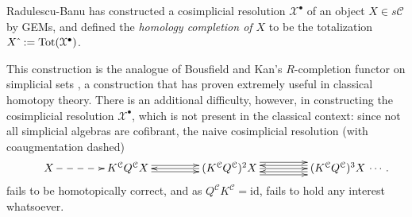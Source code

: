 \documentclass[11pt]{amsart} \renewcommand{\baselinestretch}{1.2}
\theoremstyle{plain}
\theoremstyle{definition}
\newcommand{\calx}{\mathcal{X}}
\newcommand{\calc}{\mathcal{C}}
\newcommand{\Id}{\mathrm{id}}
\begin{document}
\begin{Pi-algebras and cohomology algebras}
Radulescu-Banu \cite{Radulescu-Banu.pdf} has constructed a cosimplicial resolution $\calx^\bullet$ of an object $X\in s\calc$ by GEMs, and defined the \emph{homology completion of $X$} to be the totalization $X\hat{\ }:=\textup{Tot}(\calx^\bullet)$. 

This construction is the analogue of Bousfield and Kan's $R$-completion functor on simplicial sets \cite{BousKanSSeq.pdf}, a construction that has proven extremely useful in classical homotopy theory.
There is an additional difficulty, however,  in constructing the cosimplicial resolution $\calx^{\bullet}$, which is not present in the classical context: since not all simplicial algebras are cofibrant, the naive cosimplicial resolution (with coaugmentation dashed)
\[\makebox[0cm][r]{\,$\qquad $}\vcenter{
\def\labelstyle{\scriptstyle}
\xymatrix@C=1.5cm@1{
X\,
\ar@{-->}[r]
&
\,K^{\calc}Q^{\calc}X\,
\ar[r];[]
&
\,(K^{\calc}Q^{\calc})^2X\,
\ar@<-.65ex>[l];[]
\ar@<+.65ex>[l];[]
\ar@<+.65ex>[r];[]
\ar@<-.65ex>[r];[]
&
\,(K^{\calc}Q^{\calc})^3X\,\makebox[0cm][l]{\,$\cdots. $}
\ar[l];[]
\ar@<-1.3ex>[l];[]
\ar@<+1.3ex>[l];[]
}}\]
fails to be homotopically correct, and  as $Q^{\calc}K^{\calc}=\Id$, fails to hold any interest whatsoever.


\end{Pi-algebras and cohomology algebras}
\end{document}
